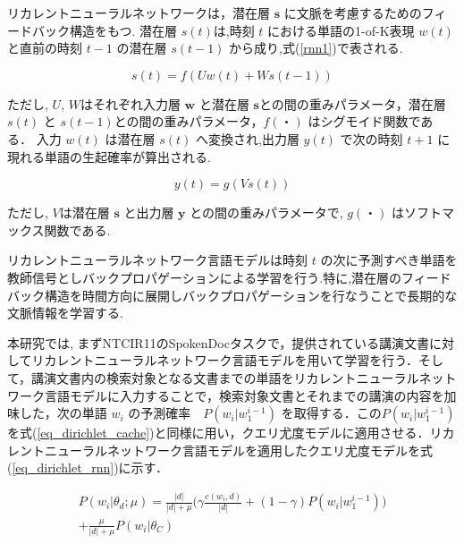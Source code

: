 リカレントニューラルネットワークは，潜在層 $\bm{s}$ に文脈を考慮するためのフィードバック構造をもつ. 潜在層 $s(t)$は,時刻 $t$ における単語の1-of-K表現 $w(t)$ と直前の時刻 $t−1$
の潜在層 $s(t−1)$ から成り,式(\ref{rnn1})で表される.

\begin{equation}
    s(t) = f(Uw(t) + Ws(t-1))
    \label{rnn1}
\end{equation}

ただし, $U$, $W$はそれぞれ入力層 $\bm{w}$ と潜在層 $\bm{s}$との間の重みパラメータ，潜在層 $s(t)$ と $s(t-1)$との間の重みパラメータ，$f(・)$ はシグモイド関数である．
入力 $w(t)$ は潜在層 $s(t)$ へ変換され,出力層 $y(t)$ で次の時刻 $t+1$ に現れる単語の生起確率が算出される.

\begin{equation}
		y(t) = g(Vs(t))
    \label{rnn3}
\end{equation}

ただし, $V$は潜在層 $\bm{s}$
と出力層 $\bm{y}$ との間の重みパラメータで, $g(・)$ はソフトマックス関数である.


リカレントニューラルネットワーク言語モデルは時刻 $t$ の次に予測すべき単語を教師信号としバックプロパゲーションによる学習を行う.特に,潜在層のフィードバック構造を時間方向に展開しバックプロパゲーションを行なうことで長期的な文脈情報を学習する.

本研究では, まずNTCIR11のSpokenDocタスクで，提供されている講演文書に対してリカレントニューラルネットワーク言語モデルを用いて学習を行う．そして，講演文書内の検索対象となる文書までの単語をリカレントニューラルネットワーク言語モデルに入力することで，検索対象文書とそれまでの講演の内容を加味した，次の単語 $w_i$ の予測確率　$P(w_i|w_1^{i-1})$ を取得する．この$P(w_i|w_1^{i-1})$ を式(\ref{eq_dirichlet_cache})と同様に用い，クエリ尤度モデルに適用させる．リカレントニューラルネットワーク言語モデルを適用したクエリ尤度モデルを式(\ref{eq_dirichlet_rnn})に示す．

\begin{equation}
\begin{split}
    P(w_i|\theta_d;\mu) = \frac{|d|}{|d|+\mu} \Biggl( \gamma \frac{c(w_i, d)}{|d|} + (1 - \gamma) P(w_i|w_1^{i-1}) \Biggr)\\
    + \frac{\mu}{|d|+\mu} P(w_i|\theta_C)
    \label{eq_dirichlet_rnn}
\end{split}
\end{equation}


